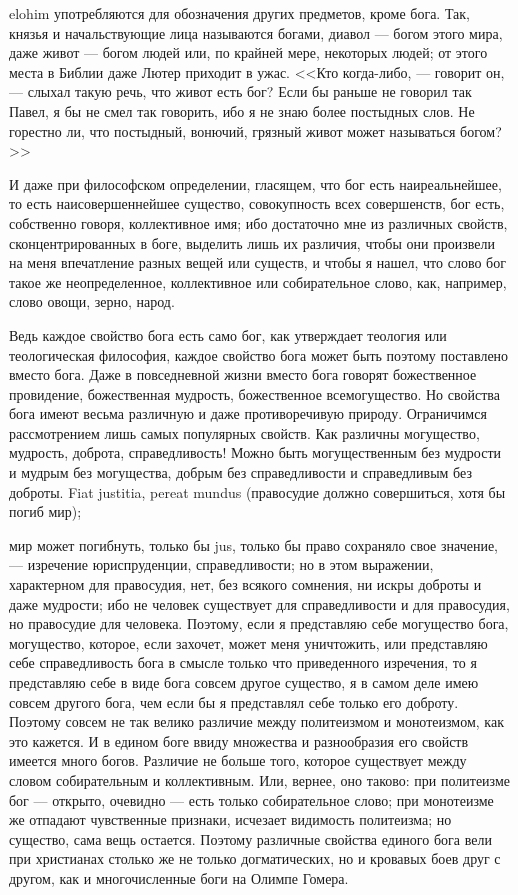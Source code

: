 \documentclass[12pt]{article}
\begin{document}
elohim употребляются для обозначения других предметов, кроме бога. Так, князья и начальствующие лица называются богами, диавол --- богом этого мира, даже живот --- богом людей или, по крайней мере, некоторых людей; от этого места в Библии даже Лютер приходит в ужас. <<Кто когда-либо, --- говорит он, --- слыхал такую речь, что живот есть бог? Если бы раньше не говорил так Павел, я бы не смел так говорить, ибо я не знаю более постыдных слов. Не горестно ли, что постыдный, вонючий, грязный живот может называться богом?>> 

И даже при философском определении, гласящем, что бог есть наиреальнейшее, то есть наисовершеннейшее существо, совокупность всех совершенств, бог есть, собственно говоря, коллективное имя; ибо достаточно мне из различных свойств, сконцентрированных в боге, выделить лишь их различия, чтобы они произвели на меня впечатление разных вещей или существ, и чтобы я нашел, что слово бог такое же неопределенное, коллективное или собирательное слово, как, например, слово овощи, зерно, народ. 

Ведь каждое свойство бога есть само бог, как утверждает теология или теологическая философия, каждое свойство бога может быть поэтому поставлено вместо бога. Даже в повседневной жизни вместо бога говорят божественное провидение, божественная мудрость, божественное всемогущество. Но свойства бога имеют весьма различную и даже противоречивую природу. Ограничимся рассмотрением лишь самых популярных свойств. Как различны могущество, мудрость, доброта, справедливость! Можно быть могущественным без мудрости и мудрым без могущества, добрым без справедливости и справедливым без доброты. Fiat justitia, pereat mundus (правосудие должно совершиться, хотя бы погиб мир); 

мир может погибнуть, только бы jus, только бы право сохраняло свое значение, --- изречение юриспруденции, справедливости; но в этом выражении, характерном для правосудия, нет, без всякого сомнения, ни искры доброты и даже мудрости; ибо не человек существует для справедливости и для правосудия, но правосудие для человека. Поэтому, если я представляю себе могущество бога, могущество, которое, если захочет, может меня уничтожить, или представляю себе справедливость бога в смысле только что приведенного изречения, то я представляю себе в виде бога совсем другое существо, я в самом деле имею совсем другого бога, чем если бы я представлял себе только его доброту. Поэтому совсем не так велико различие между политеизмом и монотеизмом, как это кажется. И в едином боге ввиду множества и разнообразия его свойств имеется много богов. Различие не больше того, которое существует между словом собирательным и коллективным. Или, вернее, оно таково: при политеизме бог --- открыто, очевидно --- есть только собирательное слово; при монотеизме же отпадают чувственные признаки, исчезает видимость политеизма; но существо, сама вещь остается. Поэтому различные свойства единого бога вели при христианах столько же не только догматических, но и кровавых боев друг с другом, как и многочисленные боги на Олимпе Гомера. 
\end{document}

